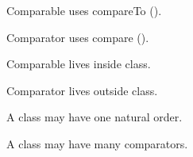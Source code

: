 \documentclass[11pt,a4paper]{book}
\begin{document}
\begin{rosettarule}

Comparable uses compareTo ().

\end{rosettarule}


\begin{rosettarule}

Comparator uses compare ().

\end{rosettarule}


\begin{rosettarule}

Comparable lives inside class.

\end{rosettarule}


\begin{rosettarule}

Comparator lives outside class.

\end{rosettarule}


\begin{rosettarule}

A class may have one natural order.

\end{rosettarule}


\begin{rosettarule}

A class may have many comparators.

\end{rosettarule}





\end{document}

